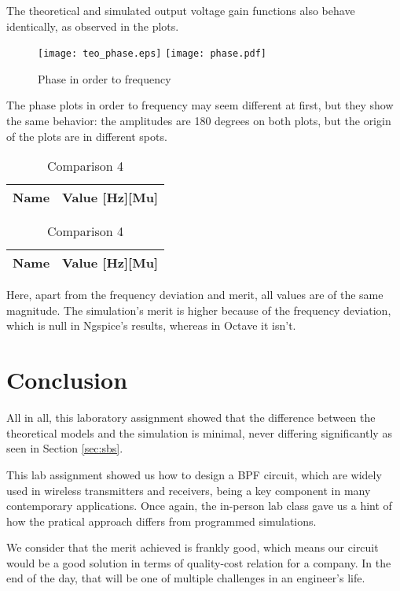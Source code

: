 The theoretical and simulated output voltage gain functions also behave identically, as observed in the plots.

\begin{figure}[h] \centering
\texttt{[image: teo\_phase.eps]}
\texttt{[image: phase.pdf]}
\caption{Phase in order to frequency}
\label{fig:comparison 4}
\end{figure}
\FloatBarrier

The phase plots in order to frequency may seem different at first, but they show the same behavior: the amplitudes are 180 degrees on both plots, but the origin of the plots are in different spots.

\begin{table}[h]
\begin{center}
  \begin{tabular}{|c|c|}
    \hline    
    {\bf Name} & {\bf Value [Hz][Mu]} \\ \hline
    
    \hline
  \end{tabular}
  \begin{tabular}{|c||c|}
    \hline    
    {\bf Name} & {\bf Value [Hz][Mu]} \\ \hline
    
    \hline
  \end{tabular}
  \caption{Comparison 4}
  \label{tab:comparison 4}
\end{center}
\end{table}
\FloatBarrier

Here, apart from the frequency deviation and merit, all values are of the same magnitude. The simulation's merit is higher because of the frequency deviation, which is null in Ngspice's results, whereas in Octave it isn't.

\section{Conclusion}
\label{sec:conclusion}

All in all, this laboratory assignment showed that the difference between the theoretical models and the simulation is minimal, never differing significantly as seen in Section \ref{sec:sbs}. \par

This lab assignment showed us how to design a BPF circuit, which are widely used in wireless transmitters and receivers, being a key component in many contemporary applications. Once again, the in-person lab class gave us a hint of how the pratical approach differs from programmed simulations. \par

We consider that the merit achieved is frankly good, which means our circuit would be a good solution in terms of quality-cost relation for a company. In the end of the day, that will be one of multiple challenges in an engineer's life.



